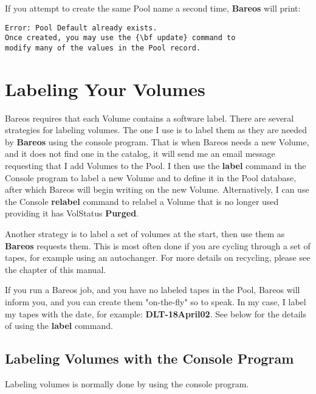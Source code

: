 If you attempt to create the same Pool name a second time, {\bf Bareos} will
print:

\footnotesize
\begin{verbatim}
Error: Pool Default already exists.
Once created, you may use the {\bf update} command to
modify many of the values in the Pool record.
\end{verbatim}
\normalsize


\section{Labeling Your Volumes}
\label{Labeling}

Bareos requires that each Volume contains a software label. There are several
strategies for labeling volumes. The one I use is to label them as they are
needed by {\bf Bareos} using the console program. That is when Bareos needs a
new Volume, and it does not find one in the catalog, it will send me an email
message requesting that I add Volumes to the Pool. I then use the {\bf label}
command in the Console program to label a new Volume and to define it in the
Pool database, after which Bareos will begin writing on the new Volume.
Alternatively, I can use the Console {\bf relabel} command to relabel a Volume
that is no longer used providing it has VolStatus {\bf Purged}.

Another strategy is to label a set of volumes at the start, then use them as
{\bf Bareos} requests them. This is most often done if you are cycling through
a set of tapes, for example using an autochanger. For more details on
recycling, please see the
 chapter of
this manual.

If you run a Bareos job, and you have no labeled tapes in the Pool, Bareos
will inform you, and you can create them "on-the-fly" so to speak. In my
case, I label my tapes with the date, for example: {\bf DLT-18April02}. See
below for the details of using the {\bf label} command.

\subsection*{Labeling Volumes with the Console Program}

Labeling volumes is normally done by using the console program.

